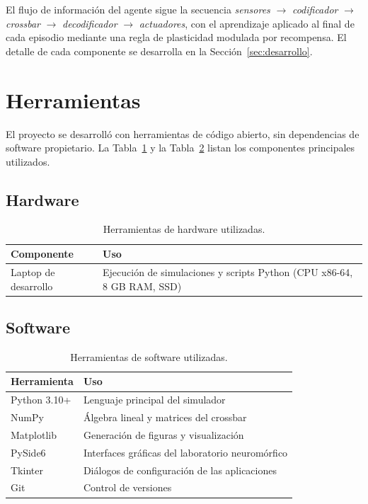 El flujo de información del agente sigue la secuencia 
\textit{sensores} $\rightarrow$ \textit{codificador} 
$\rightarrow$ \textit{crossbar} $\rightarrow$ \textit{decodificador} 
$\rightarrow$ \textit{actuadores}, con el aprendizaje aplicado al 
final de cada episodio mediante una regla de plasticidad 
modulada por recompensa. El detalle de cada componente se 
desarrolla en la Sección~\ref{sec:desarrollo}.

\section{Herramientas}

El proyecto se desarrolló con herramientas de código abierto,
sin dependencias de software propietario. La Tabla~\ref{tab:hardware} y la
Tabla~\ref{tab:software} listan los componentes principales utilizados.

\subsection{Hardware}

\begin{table}[H]
\centering
\caption{Herramientas de hardware utilizadas.}
\label{tab:hardware}
\begin{tabular}{lp{9cm}}
\hline
\textbf{Componente} & \textbf{Uso} \\
\hline
Laptop de desarrollo & Ejecución de simulaciones y scripts Python (CPU x86-64, 8 GB RAM, SSD) \\
\hline
\end{tabular}
\end{table}

\subsection{Software}

\begin{table}[H]
\centering
\caption{Herramientas de software utilizadas.}
\label{tab:software}
\begin{tabular}{lp{9cm}}
\hline
\textbf{Herramienta} & \textbf{Uso} \\
\hline
Python 3.10+ & Lenguaje principal del simulador \\
NumPy & Álgebra lineal y matrices del crossbar \\
Matplotlib & Generación de figuras y visualización \\
PySide6 & Interfaces gráficas del laboratorio neuromórfico \\
Tkinter & Diálogos de configuración de las aplicaciones \\
Git & Control de versiones \\
\hline
\end{tabular}
\end{table}

